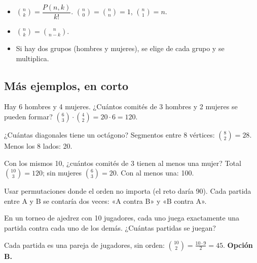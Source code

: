 
\begin{regla}
\begin{itemize}
  \item $\binom{n}{k} = \dfrac{P(n, k)}{k!}$. $\binom n0 = \binom nn = 1$, $\binom n1 = n$.
  \item $\binom nk = \binom n{n-k}$.
  \item Si hay dos grupos (hombres y mujeres), se elige de cada grupo y se multiplica.
\end{itemize}
\end{regla}

\subsection{Más ejemplos, en corto}
\begin{ejemplo}
Hay 6 hombres y 4 mujeres. ¿Cuántos comités de 3 hombres y 2 mujeres se pueden formar?
\solucion $\binom63 \cdot \binom42 = 20 \cdot 6 = 120$.
\end{ejemplo}

\begin{ejemplo}[Diagonales]
¿Cuántas diagonales tiene un octágono?
\solucion Segmentos entre 8 vértices: $\binom82 = 28$. Menos los 8 lados: 20.
\end{ejemplo}

\begin{ejemplo}
Con los mismos 10, ¿cuántos comités de 3 tienen al menos una mujer?
\solucion Total $\binom{10}{3} = 120$; sin mujeres $\binom63 = 20$. Con al menos una: 100.
\end{ejemplo}

\begin{trampa}
Usar permutaciones donde el orden no importa (el reto daría 90). Cada partida entre A y B se contaría dos veces: «A contra
B» y «B contra A».
\end{trampa}

\begin{reto}
En un torneo de ajedrez con 10 jugadores, cada uno juega exactamente una partida contra cada uno de los demás. ¿Cuántas
partidas se juegan?
\end{reto}

\begin{retoresuelto}
Cada partida es una pareja de jugadores, sin orden: $\binom{10}{2} = \tfrac{10 \cdot 9}{2} = 45$. \textbf{Opción B.}
\end{retoresuelto}

